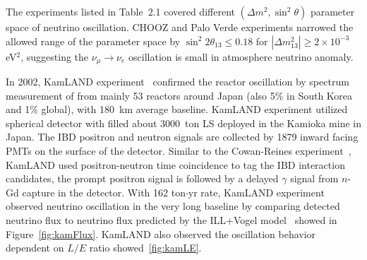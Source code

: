     The experiments listed in Table~2.1 covered different $(\Delta m^2, \sin^2\theta)$ parameter space of neutrino oscillation.
    CHOOZ and Palo Verde experiments narrowed the allowed range of the parameter space by $\sin^2 2\theta_{13} \le 0.18$ for $|\Delta m^2_{13}|\ge 2\times 10^{-3}$ eV$^2$, suggesting the $\nu_\mu \rightarrow \nu_e$ oscillation is small in atmosphere neutrino anomaly.
    
    In 2002, KamLAND experiment~\cite{bib:KamLAND03, bib:kamland04} confirmed the reactor \nuebar oscillation by spectrum measurement of \nuebar from mainly 53 reactors around Japan (also 5\% in South Korea and 1\% global), with 180~km average baseline.
    KamLAND experiment utilized spherical detector with filled about 3000~ton LS deployed in the Kamioka mine in Japan. 
    The IBD positron and neutron signals are collected by 1879 inward facing PMTs on the surface of the detector. 
    Similar to the Cowan-Reines experiment~\cite{bib:CowanReines}, KamLAND used positron-neutron time coincidence to tag the IBD interaction candidates, the prompt positron signal is followed by a delayed $\gamma$ signal from $n$-Gd capture in the detector.
    With 162 ton$\cdot$yr \nuebar rate, KamLAND experiment observed neutrino oscillation in the very long baseline by comparing detected neutrino flux to neutrino flux predicted by the ILL+Vogel model~\cite{bib:ILL1982, bib:ILL1985, bib:ILL1989, bib:vogel} showed in Figure~\ref{fig:kamFlux}.
    KamLAND also observed the oscillation behavior dependent on $L/E$ ratio showed~\ref{fig:kamLE}.
    
